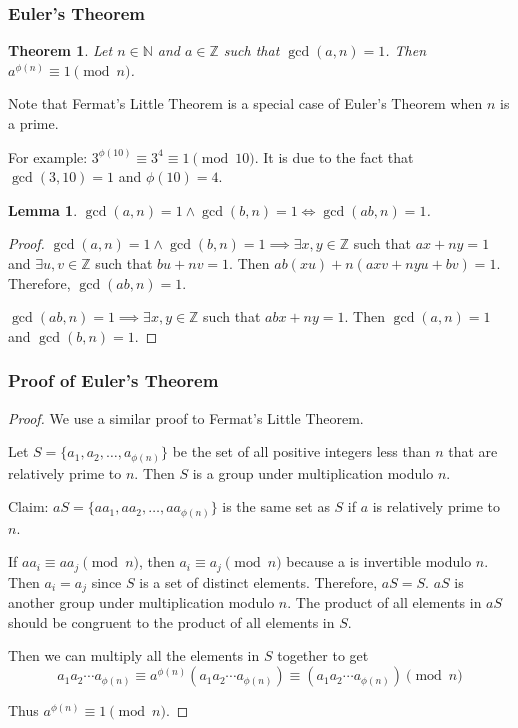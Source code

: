 \documentclass[letterpaper,12pt,oneside]{article}
\newtheorem{theorem}{Theorem}
\newtheorem*{lemma}{Lemma}
\begin{document}
\subsubsection{Euler's Theorem}
\begin{theorem}
    Let $n\in \mathbb{N}$ and $a\in \mathbb{Z}$ such that $\gcd(a,n)=1$. Then $a^{\phi(n)}\equiv 1 \pmod n$.
\end{theorem}
Note that Fermat's Little Theorem is a special case of Euler's Theorem when $n$ is a prime.

For example: $3^{\phi(10)}\equiv 3^4\equiv 1 \pmod {10}$. It is due to the fact that $\gcd(3,10)=1$ and $\phi(10)=4$.

\begin{lemma}
    $\gcd(a,n)=1 \land \gcd(b,n)=1 \iff \gcd(ab,n)=1$.
\end{lemma}
\begin{proof}
    $\gcd(a,n)=1 \land \gcd(b,n)=1 \implies \exists x,y\in \mathbb{Z}$ such that $ax+ny=1$ and $\exists u,v\in \mathbb{Z}$ such that $bu+nv=1$. Then $ab(xu)+n(axv+nyu+bv)=1$. Therefore, $\gcd(ab,n)=1$.

    $\gcd(ab,n)=1 \implies \exists x,y\in \mathbb{Z}$ such that $abx+ny=1$. Then $\gcd(a,n)=1$ and $\gcd(b,n)=1$.
\end{proof}
\subsubsection{Proof of Euler's Theorem}
\begin{proof}
    We use a similar proof to Fermat's Little Theorem.

    Let $S=\{a_1,a_2,\ldots,a_{\phi(n)}\}$ be the set of all positive integers less than $n$ that are relatively prime to $n$. Then $S$ is a group under multiplication modulo $n$.

    Claim: $aS=\{aa_1,aa_2,\ldots,aa_{\phi(n)}\}$ is the same set as $S$ if $a$ is relatively prime to $n$.

    If $aa_i\equiv aa_j \pmod n$, then $a_i\equiv a_j \pmod n$ because a is invertible modulo $n$. Then $a_i=a_j$ since $S$ is a set of distinct elements. Therefore, $aS=S$. $aS$ is another group under multiplication modulo $n$. The product of all elements in $aS$ should be congruent to the product of all elements in $S$.

    Then we can multiply all the elements in $S$ together to get \[
        a_1a_2\cdots a_{\phi(n)}\equiv a^{\phi(n)}(a_{1}a_{2}\cdots a_{\phi(n)})\equiv (a_{1}a_{2}\cdots a_{\phi(n)})\pmod n
    \]

    Thus $a^{\phi(n)}\equiv 1 \pmod n$.
\end{proof}
\end{document}
